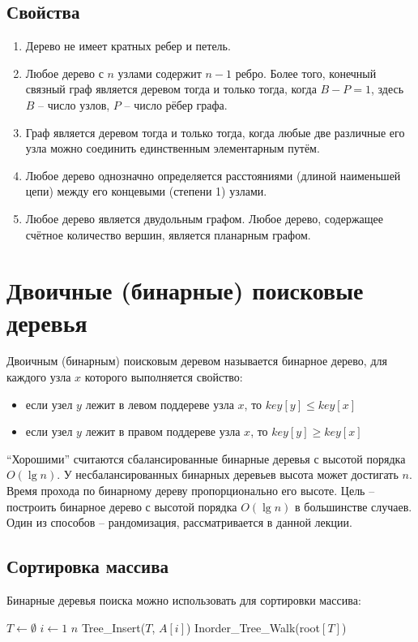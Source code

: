 \subsection{Свойства}
\begin{enumerate}
\item Дерево не имеет кратных ребер и петель.
\item Любое дерево с $n$ узлами содержит $n-1$ ребро. Более того, конечный связный граф является деревом тогда и только тогда, когда $B-P = 1$, здесь $B$ -- число узлов, $P$ -- число рёбер графа.
\item Граф является деревом тогда и только тогда, когда любые две различные его узла можно соединить единственным элементарным путём.
\item Любое дерево однозначно определяется расстояниями (длиной наименьшей цепи) между его концевыми (степени 1) узлами.
\item Любое дерево является двудольным графом. Любое дерево, содержащее счётное количество вершин, является планарным графом.
\end{enumerate}

\section{Двоичные (бинарные) поисковые деревья}
Двоичным (бинарным) поисковым деревом называется бинарное дерево, для каждого узла $x$ которого выполняется свойство:
\begin{itemize}
\item если узел $y$ лежит в левом поддереве узла $x$, то $key[y] \leqslant key[x]$
\item если узел $y$ лежит в правом поддереве узла $x$, то $key[y] \geqslant key[x]$
\end{itemize}

``Хорошими'' считаются сбалансированные бинарные деревья с высотой порядка $O(\lg n)$. У несбалансированных бинарных деревьев высота может достигать $n$. Время прохода по бинарному дереву пропорционально его высоте. Цель -- построить бинарное дерево с высотой порядка $O(\lg n)$ в большинстве случаев. Один из способов -- рандомизация, рассматривается в данной лекции.

\subsection{Сортировка массива}
Бинарные деревья поиска можно использовать для сортировки массива:
\begin{codebox}
\li $T \gets \emptyset $
\li \For $i \gets 1$ \To $n$
\li \Do Tree\_Insert($T$, $A[i]$)
  \End
\li Inorder\_Tree\_Walk(root$[T]$)
\end{codebox}

